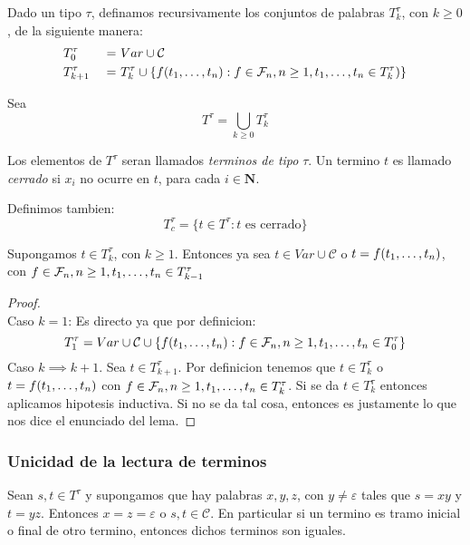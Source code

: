 Dado un tipo $\tau$, definamos recursivamente los conjuntos de palabras $T_k^\tau$, con $k \geq 0$, de la siguiente manera:
\begin{alignat*}{3}
  &T_0^\tau &\ =&\ Var \cup \mathcal{C}\\
  &T_{k+1}^\tau &\ =&\ T_{k}^\tau \cup \{f(t_{1}, \dots, t_{n}) : f \in \mathcal{F}_n, n \geq 1, t_{1}, \dots, t_{n} \in T_k^\tau)\} 
\end{alignat*}

Sea
$$
T^\tau = \bigcup_{k \geq 0}T_k^\tau
$$

Los elementos de $T^\tau$ seran llamados \emph{terminos de tipo} $\tau$. Un termino $t$ es llamado \emph{cerrado} si $x_i$ no ocurre en $t$, para cada $i \in \mathbf{N}$.

Definimos tambien:
$$
T_c^\tau = \{t \in T^\tau : t \text{ es cerrado}\}
$$

\begin{lemma}
  Supongamos $t \in T_k^\tau$, con $k \geq 1$. Entonces ya sea $t \in Var \cup \mathcal{C}$ o $t = f(t_{1}, \dots, t_{n})$, con
  $f \in \mathcal{F}_n, n \geq 1, t_{1}, \dots, t_{n} \in T_{k-1}^\tau$
\end{lemma}

\begin{proof}
  $ $\\
  Caso $k=1$: Es directo ya que por definicion:
  $$
  T_1^\tau=Var\cup\mathcal{C}\cup\{f(t_{1}, \dots, t_{n}):f\in\mathcal{F}_n, n\geq1,t_{1}, \dots, t_{n}\in T_0^\tau\}
  $$
  Caso $k\implies k+1$. Sea $t\in T^\tau_{k+1}$. Por definicion tenemos que $t\in T^\tau_k$ o
  $t = f(t_{1}, \dots, t_{n})$ con $f\in\mathcal{F}_n,n\geq1,t_{1}, \dots, t_{n}\in T_k^\tau$. Si se da $t\in T^\tau_k$ entonces 
  aplicamos hipotesis inductiva. Si no se da tal cosa, entonces es justamente lo que nos dice el enunciado del lema.
\end{proof}

\subsubsection{Unicidad de la lectura de terminos}

\begin{lemma}
  Sean $s, t \in T^\tau$ y supongamos que hay palabras $x, y, z$, con $y \neq \varepsilon$ tales que $s = xy$ y $t = yz$. Entonces 
  $x = z = \varepsilon$ o $s, t \in \mathcal{C}$. En particular si un termino es tramo inicial o final de otro termino, entonces dichos terminos son iguales.
\end{lemma}
\noproof

